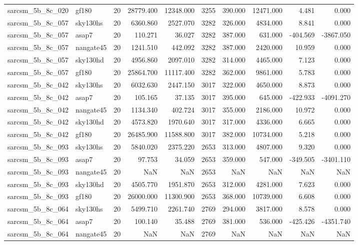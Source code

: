 \documentclass{article}
\begin{document}
\begin{longtable}{llrrrrrrrr}
sarcsm\_5b\_8c\_020 & gf180 & 20 & 28779.400 & 12348.000 & 3255 & 390.000 & 12471.000 & 4.481 & 0.000 \\
sarcsm\_5b\_8c\_057 & sky130hs & 20 & 6360.860 & 2527.070 & 3282 & 326.000 & 4834.000 & 8.841 & 0.000 \\
sarcsm\_5b\_8c\_057 & asap7 & 20 & 110.271 & 36.027 & 3282 & 387.000 & 631.000 & -404.569 & -3867.050 \\
sarcsm\_5b\_8c\_057 & nangate45 & 20 & 1241.510 & 442.092 & 3282 & 387.000 & 2420.000 & 10.959 & 0.000 \\
sarcsm\_5b\_8c\_057 & sky130hd & 20 & 4956.860 & 2097.010 & 3282 & 314.000 & 4465.000 & 7.123 & 0.000 \\
sarcsm\_5b\_8c\_057 & gf180 & 20 & 25864.700 & 11117.400 & 3282 & 362.000 & 9861.000 & 5.783 & 0.000 \\
sarcsm\_5b\_8c\_042 & sky130hs & 20 & 6032.630 & 2447.150 & 3017 & 322.000 & 4650.000 & 8.873 & 0.000 \\
sarcsm\_5b\_8c\_042 & asap7 & 20 & 105.165 & 37.135 & 3017 & 395.000 & 645.000 & -422.933 & -4091.270 \\
sarcsm\_5b\_8c\_042 & nangate45 & 20 & 1134.340 & 402.724 & 3017 & 355.000 & 2186.000 & 10.972 & 0.000 \\
sarcsm\_5b\_8c\_042 & sky130hd & 20 & 4573.820 & 1970.640 & 3017 & 317.000 & 4336.000 & 6.665 & 0.000 \\
sarcsm\_5b\_8c\_042 & gf180 & 20 & 26485.900 & 11588.800 & 3017 & 382.000 & 10734.000 & 5.218 & 0.000 \\
sarcsm\_5b\_8c\_093 & sky130hs & 20 & 5840.020 & 2375.220 & 2653 & 313.000 & 4807.000 & 9.320 & 0.000 \\
sarcsm\_5b\_8c\_093 & asap7 & 20 & 97.753 & 34.059 & 2653 & 359.000 & 547.000 & -349.505 & -3401.110 \\
sarcsm\_5b\_8c\_093 & nangate45 & 20 & NaN & NaN & 2653 & NaN & NaN & NaN & NaN \\
sarcsm\_5b\_8c\_093 & sky130hd & 20 & 4505.770 & 1951.870 & 2653 & 312.000 & 4281.000 & 7.623 & 0.000 \\
sarcsm\_5b\_8c\_093 & gf180 & 20 & 26000.000 & 11300.900 & 2653 & 368.000 & 10739.000 & 6.608 & 0.000 \\
sarcsm\_5b\_8c\_064 & sky130hs & 20 & 5499.710 & 2261.740 & 2769 & 294.000 & 3817.000 & 8.578 & 0.000 \\
sarcsm\_5b\_8c\_064 & asap7 & 20 & 100.140 & 35.488 & 2769 & 381.000 & 536.000 & -425.426 & -4351.740 \\
sarcsm\_5b\_8c\_064 & nangate45 & 20 & NaN & NaN & 2769 & NaN & NaN & NaN & NaN \\

\end{longtable}
\end{document}
